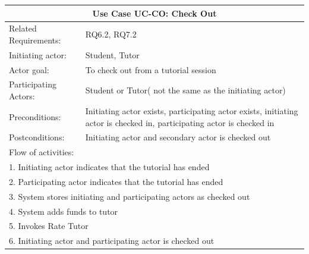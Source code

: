 \documentclass[12pt]{article}
\begin{document}
{		\begin{tabular}{| l | p{10cm}| }
			\hline\multicolumn{2}{|c|}{ \textbf{Use Case UC-CO: Check Out } }\\ \hline
			Related Requirements: &  RQ6.2, RQ7.2\\ \hline
			Initiating actor: & Student, Tutor \\ \hline
			Actor goal: & To check out from a tutorial session\\ \hline
			Participating Actors: & Student or Tutor( not the same as the initiating actor)\\ \hline
			Preconditions: &Initiating actor exists, participating actor exists, initiating actor is checked in, participating actor is checked in\\ \hline
			Postconditions: &Initiating actor and secondary actor is checked out\\ \hline
			\multicolumn{2}{|l|}{Flow of activities:}\\ \hline
			\multicolumn{2}{|p{15cm}|}{1. Initiating actor indicates that the tutorial has ended}\\
			\multicolumn{2}{|p{15cm}|}{2. Participating actor indicates that the tutorial has ended}\\
			\multicolumn{2}{|l|}{3. System stores initiating and participating actors as checked out}\\
      \multicolumn{2}{|l|}{4. System adds funds to tutor}\\
			\multicolumn{2}{|l|}{5. Invokes Rate Tutor}\\
			\multicolumn{2}{|l|}{6. Initiating actor and participating actor is checked out}\\
			 \hline
		\end{tabular}


}
\end{document}
